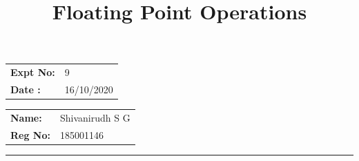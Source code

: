 \documentclass[10pt,a4paper]{article}
\title{\bf Floating Point Operations}
\author{\vspace{-10ex}}
\date{\vspace{-10ex}}
\begin{document}
\maketitle

\begin{minipage}{0.45\textwidth}
        \begin{tabular}{l l}
            \textbf{Expt No:}&9\\
            \textbf{Date :}&16/10/2020
        \end{tabular}
\end{minipage}%
\begin{minipage}{0.45\textwidth}
        \begin{tabular}{l l}
             \textbf{Name:}& Shivanirudh S G  \\
             \textbf{Reg No:} & 185001146 
        \end{tabular}
\end{minipage}
\vspace{1cm}
\hrule
\end{document}
